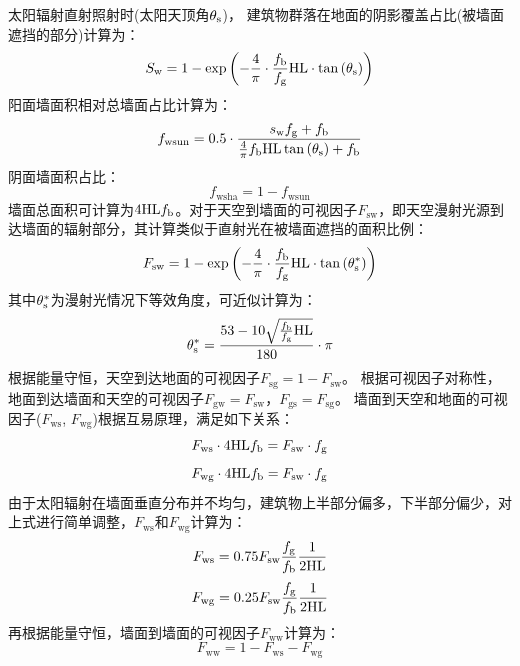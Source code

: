 太阳辐射直射照射时(太阳天顶角$\theta_{\rm s}$)，
建筑物群落在地面的阴影覆盖占比(被墙面遮挡的部分)计算为：
\begin{equation}\label{S_w}
  S_{\mathrm{w}}=1-\exp \left(-\frac{4}{\pi} \cdot \frac{f_{\mathrm{b}}}{f_{\mathrm{g}}} {\rm HL} \cdot \tan \left(\theta_{\mathrm{s}}\right)\right)
\end{equation}
阳面墙面积相对总墙面占比计算为：
\begin{equation}\label{f_wsun}
  f_{\mathrm{wsun}}=0.5 \cdot \frac{s_{\mathrm{w}} f_{\mathrm{g}}+f_{\mathrm{b}}}{\frac{4}{\pi} f_{\mathrm{b}} {\rm HL} \tan \left(\theta_{\mathrm{s}}\right)+f_{\mathrm{b}}}
\end{equation}
阴面墙面积占比：
\begin{equation}\label{f_wsha}
  f_{\mathrm{wsha}}=1-f_{\mathrm{wsun}}
\end{equation}
墙面总面积可计算为$4{\rm HL}f_{\rm b}$。对于天空到墙面的可视因子$F_{\mathrm{sw}}$，即天空漫射光源到达墙面的辐射部分，其计算类似于直射光在被墙面遮挡的面积比例：
\begin{equation}\label{f_sw}
  F_{\mathrm{sw}}=1-\exp \left(-\frac{4}{\pi} \cdot \frac{f_{\mathrm{b}}}{f_{\mathrm{g}}} {\rm HL} \cdot \tan \left(\theta_{\mathrm{s}}^{*}\right)\right)
\end{equation}
其中$\theta_{\rm s}^\ast$为漫射光情况下等效角度，可近似计算为：
\begin{equation}
  \theta_{\mathrm{s}}^{*}=\frac{53-10 \sqrt{\frac{f_{\mathrm{b}}}{f_{\mathrm{g}}} {\rm HL}}}{180} \cdot \pi
\end{equation}
根据能量守恒，天空到达地面的可视因子$F_{\mathrm{sg}}=1-F_{\mathrm{sw}}$。
根据可视因子对称性，地面到达墙面和天空的可视因子$F_{\mathrm{gw}}=F_{\mathrm{sw}}$，$F_{\mathrm{gs}}=F_{\mathrm{sg}}$。
墙面到天空和地面的可视因子($F_{\mathrm{ws}}$, $F_{\mathrm{wg}}$)根据互易原理，满足如下关系：
\begin{equation}
  F_{\mathrm{ws}} \cdot 4 {\rm HL} f_{\mathrm{b}}=F_{\mathrm{s w}} \cdot f_{\mathrm{g}}
\end{equation}
\begin{equation}
  F_{\mathrm{wg}} \cdot 4 {\rm HL} f_{\mathrm{b}}=F_{\mathrm{s w}} \cdot f_{\mathrm{g}}
\end{equation}
由于太阳辐射在墙面垂直分布并不均匀，建筑物上半部分偏多，下半部分偏少，对上式进行简单调整，$F_{\mathrm{ws}}$和$F_{\mathrm{wg}}$计算为：
\begin{equation}
  F_{\mathrm{ws}}=0.75 F_{\mathrm{s w}} \frac{f_{\mathrm{g}}}{f_{\mathrm{b}}} \frac{1}{2 {\rm HL}}
\end{equation}
\begin{equation}
  F_{\mathrm{wg}}=0.25 F_{\mathrm{s w}} \frac{f_{\mathrm{g}}}{f_{\mathrm{b}}} \frac{1}{2 {\rm HL}}
\end{equation}
再根据能量守恒，墙面到墙面的可视因子$F_{\mathrm{ww}}$计算为：
\begin{equation}
  F_{\mathrm{ww}}=1-F_{\mathrm{ws}}-F_{\mathrm{wg}}
\end{equation}

